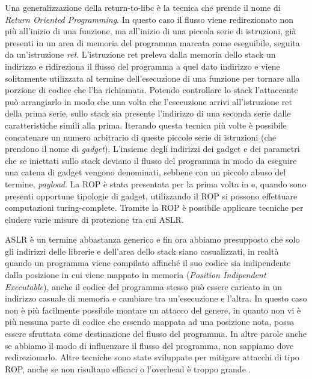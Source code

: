 Una generalizzazione della return-to-libc \`{e} la tecnica che prende il
nome di \emph{Return Oriented
  Programming}\cite{Shacham-2007,Roemer-2012}. In questo caso il
flusso viene redirezionato non pi\`{u} all'inizio di una funzione, ma
all'inizio di una piccola serie di istruzioni, gi\`{a} presenti in un area
di memoria del programma marcata come eseguibile, seguita da
un'istruzione {\em ret}. L'istruzione ret preleva dalla memoria dello stack
un indirizzo e ridireziona il flusso del programma a quel dato
indirizzo e viene solitamente utilizzata al termine dell'esecuzione di
una funzione per tornare alla porzione di codice che l'ha
richiamata. Potendo controllare lo stack l'attaccante pu\`{o} arrangiarlo
in modo che una volta che l'esecuzione arrivi all'istruzione ret della
prima serie, sullo stack sia presente l'indirizzo di una seconda serie
dalle caratteristiche simili alla prima. Iterando questa tecnica pi\`{u}
volte \`{e} possibile concatenare un numero arbitrario di queste piccole
serie di istruzioni (che prendono il nome di \emph{gadget}). L'insieme
degli indirizzi dei gadget e dei parametri che se iniettati sullo
stack deviano il flusso del programma in modo da eseguire una catena
di gadget vengono denominati, sebbene con un piccolo abuso del
termine, \emph{payload}. La ROP \`{e} stata presentata per la prima volta in
\cite{Shacham-2007} e, quando sono presenti opportune tipologie di
gadget, utilizzando il ROP si possono effettuare computazioni
turing-complete. Tramite la ROP \`{e} possibile applicare tecniche per
eludere varie misure di protezione \cite{roglia:2009} tra cui ASLR.

ASLR \`{e} un termine abbastanza generico e fin ora abbiamo presupposto
che solo gli indirizzi delle librerie e dell'area dello stack siano
casualizzati, in realt\`{a} quando un programma viene compilato affinch\'{e}
il suo codice sia indipendente dalla posizione in cui viene mappato in
memoria (\emph{Position Indipendent Executable}), anche il codice del
programma stesso pu\`{o} essere caricato in un indirizzo casuale di
memoria e cambiare tra un'esecuzione e l'altra. In questo caso non \`{e}
pi\`{u} facilmente possibile montare un attacco del genere, in quanto non
vi \`{e} pi\`{u} nessuna parte di codice che essendo mappata ad una posizione
nota, possa essere sfruttata come destinazione del flusso del
programma. In altre parole anche se abbiamo il modo di influenzare il
flusso del programma, non sappiamo dove redirezionarlo. Altre tecniche
sono state sviluppate per mitigare attacchi di tipo ROP, anche se non
risultano efficaci o l'overhead \`{e} troppo grande \cite{Davi-2014}.

